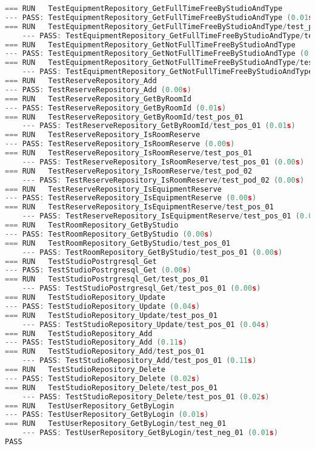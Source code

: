 \begin{lstlisting}[language=go, label=lst:testing_res]
=== RUN   TestEquipmentRepository_GetFullTimeFreeByStudioAndType
--- PASS: TestEquipmentRepository_GetFullTimeFreeByStudioAndType (0.01s)
=== RUN   TestEquipmentRepository_GetFullTimeFreeByStudioAndType/test_pos_01
	--- PASS: TestEquipmentRepository_GetFullTimeFreeByStudioAndType/test_pos_01 (0.01s)
=== RUN   TestEquipmentRepository_GetNotFullTimeFreeByStudioAndType
--- PASS: TestEquipmentRepository_GetNotFullTimeFreeByStudioAndType (0.01s)
=== RUN   TestEquipmentRepository_GetNotFullTimeFreeByStudioAndType/test_pos_01
	--- PASS: TestEquipmentRepository_GetNotFullTimeFreeByStudioAndType/test_pos_01 (0.01s)
=== RUN   TestReserveRepository_Add
--- PASS: TestReserveRepository_Add (0.00s)
=== RUN   TestReserveRepository_GetByRoomId
--- PASS: TestReserveRepository_GetByRoomId (0.01s)
=== RUN   TestReserveRepository_GetByRoomId/test_pos_01
	--- PASS: TestReserveRepository_GetByRoomId/test_pos_01 (0.01s)
=== RUN   TestReserveRepository_IsRoomReserve
--- PASS: TestReserveRepository_IsRoomReserve (0.00s)
=== RUN   TestReserveRepository_IsRoomReserve/test_pos_01
	--- PASS: TestReserveRepository_IsRoomReserve/test_pos_01 (0.00s)
=== RUN   TestReserveRepository_IsRoomReserve/test_pod_02
	--- PASS: TestReserveRepository_IsRoomReserve/test_pod_02 (0.00s)
=== RUN   TestReserveRepository_IsEquipmentReserve
--- PASS: TestReserveRepository_IsEquipmentReserve (0.00s)
=== RUN   TestReserveRepository_IsEquipmentReserve/test_pos_01
	--- PASS: TestReserveRepository_IsEquipmentReserve/test_pos_01 (0.00s)
=== RUN   TestRoomRepository_GetByStudio
--- PASS: TestRoomRepository_GetByStudio (0.00s)
=== RUN   TestRoomRepository_GetByStudio/test_pos_01
	--- PASS: TestRoomRepository_GetByStudio/test_pos_01 (0.00s)
=== RUN   TestStudioPostrgresql_Get
--- PASS: TestStudioPostrgresql_Get (0.00s)
=== RUN   TestStudioPostrgresql_Get/test_pos_01
	--- PASS: TestStudioPostrgresql_Get/test_pos_01 (0.00s)
=== RUN   TestStudioRepository_Update
--- PASS: TestStudioRepository_Update (0.04s)
=== RUN   TestStudioRepository_Update/test_pos_01
	--- PASS: TestStudioRepository_Update/test_pos_01 (0.04s)
=== RUN   TestStudioRepository_Add
--- PASS: TestStudioRepository_Add (0.11s)
=== RUN   TestStudioRepository_Add/test_pos_01
	--- PASS: TestStudioRepository_Add/test_pos_01 (0.11s)
=== RUN   TestStudioRepository_Delete
--- PASS: TestStudioRepository_Delete (0.02s)
=== RUN   TestStudioRepository_Delete/test_pos_01
	--- PASS: TestStudioRepository_Delete/test_pos_01 (0.02s)
=== RUN   TestUserRepository_GetByLogin
--- PASS: TestUserRepository_GetByLogin (0.01s)
=== RUN   TestUserRepository_GetByLogin/test_neg_01
	--- PASS: TestUserRepository_GetByLogin/test_neg_01 (0.01s)
PASS
\end{lstlisting}


